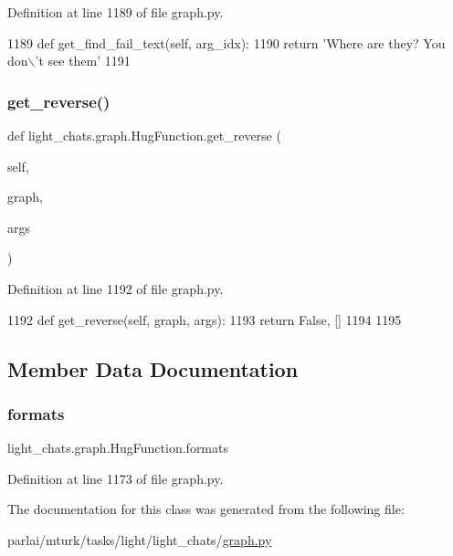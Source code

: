 Definition at line 1189 of file graph.\+py.


\begin{DoxyCode}
1189     \textcolor{keyword}{def }get\_find\_fail\_text(self, arg\_idx):
1190         \textcolor{keywordflow}{return} \textcolor{stringliteral}{'Where are they? You don\(\backslash\)'t see them'}
1191 
\end{DoxyCode}
\mbox{\label{classlight__chats_1_1graph_1_1HugFunction_ae028317cf500a21a8787b73ca7964e48}} 
\subsubsection{\texorpdfstring{get\+\_\+reverse()}{get\_reverse()}}
{\footnotesize\ttfamily def light\+\_\+chats.\+graph.\+Hug\+Function.\+get\+\_\+reverse (\begin{DoxyParamCaption}\item[{}]{self,  }\item[{}]{graph,  }\item[{}]{args }\end{DoxyParamCaption})}



Definition at line 1192 of file graph.\+py.


\begin{DoxyCode}
1192     \textcolor{keyword}{def }get\_reverse(self, graph, args):
1193         \textcolor{keywordflow}{return} \textcolor{keyword}{False}, []
1194 
1195 
\end{DoxyCode}


\subsection{Member Data Documentation}
\mbox{\label{classlight__chats_1_1graph_1_1HugFunction_a9671b61b4a4c5e2d97093da92ec4a431}} 
\subsubsection{\texorpdfstring{formats}{formats}}
{\footnotesize\ttfamily light\+\_\+chats.\+graph.\+Hug\+Function.\+formats}



Definition at line 1173 of file graph.\+py.



The documentation for this class was generated from the following file\+:\begin{DoxyCompactItemize}
\item 
parlai/mturk/tasks/light/light\+\_\+chats/\hyperlink{parlai_2mturk_2tasks_2light_2light__chats_2graph_8py}{graph.\+py}\end{DoxyCompactItemize}

